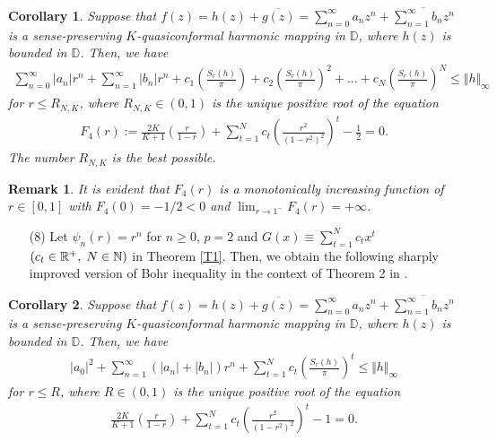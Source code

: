 \documentclass[11pt,reqno]{amsart}
\newtheorem{cor}{Corollary}[section]
\newtheorem{rem}{Remark}[section]
\newtheorem{open problem}{Open problem}[section]
\newcommand{\N}{{\Bbb{N}}}
\newcommand{\R}{{\Bbb{R}}}
\newcommand{\ol}{\overline}
\newcommand{\beas}{\begin{eqnarray*}}
\newcommand{\eeas}{\end{eqnarray*}}
\numberwithin{equation}{section}
\begin{document}
\begin{cor}Suppose that $f(z)=h(z)+\ol{g(z)}=\sum_{n=0}^\infty a_n z^n+\ol{\sum_{n=1}^\infty b_n z^n}$ is a sense-preserving $K$-quasiconformal harmonic mapping in $\mathbb{D}$, where $h(z)$ is bounded in $\mathbb{D}$. Then, we have
\beas \sum_{n=0}^\infty |a_n|r^n+\sum_{n=1}^\infty |b_n| r^n+c_1\left(\frac{S_r(h)}{\pi}\right)+c_2\left(\frac{S_r(h)}{\pi}\right)^2+\ldots+c_N\left(\frac{S_r(h)}{\pi}\right)^N\leq \Vert h\Vert_\infty\eeas
for $r\leq R_{N,K}$, where $R_{N,K}\in(0,1)$ is the unique positive root of the equation 
\beas F_4(r):=\frac{2K}{K+1}\left(\frac{r}{1-r}\right)+\sum_{t=1}^N c_t\left(\frac{r^2}{\left(1-r^2\right)^2}\right)^t-\frac{1}{2}=0.\eeas
The number $R_{N,K}$ is the best possible.
\end{cor}
\begin{rem} It is evident that $F_4(r)$ is a monotonically increasing function of $r\in[0,1]$ with $F_4(0)=-1/2<0$ and $\lim_{r\to1^-}F_4(r)=+\infty$. \end{rem}
\begin{itemize}
\item[(8)] Let $\psi_n(r)=r^n$ for $n\geq 0$, $p=2$ and $G(x)\equiv \sum_{t=1}^N c_t x^t$ $(c_t\in\R^+,\; N\in\N)$ in \textrm{Theorem \ref{T1}}. Then, we obtain the following sharply improved version of Bohr inequality in the context of \textrm{Theorem 2} in  \cite{KPS2018}.\end{itemize}
\begin{cor}Suppose that $f(z)=h(z)+\ol{g(z)}=\sum_{n=0}^\infty a_n z^n+\ol{\sum_{n=1}^\infty b_n z^n}$ is a sense-preserving $K$-quasiconformal harmonic mapping in $\mathbb{D}$, where $h(z)$ is bounded in $\mathbb{D}$. Then, we have
\beas |a_0|^2+\sum_{n=1}^\infty\left( |a_n|+ |b_n|\right) r^n+\sum_{t=1}^N c_t\left(\frac{S_r(h)}{\pi}\right)^t\leq \Vert h\Vert_\infty\eeas
for $r\leq R$, where $R\in(0,1)$ is the unique positive root of the equation 
\beas \frac{2K}{K+1}\left(\frac{r}{1-r}\right)+\sum_{t=1}^N c_t\left(\frac{r^2}{\left(1-r^2\right)^2}\right)^t-1=0.\eeas\end{cor}
\end{document}
